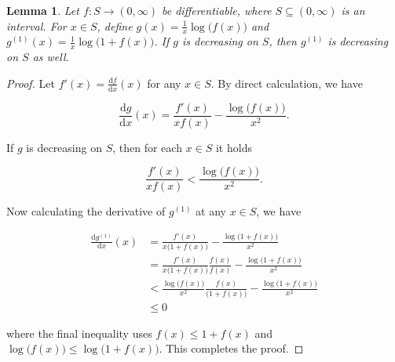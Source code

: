 \documentclass{article}
\newcommand{\D}{\textrm{d}}
\newtheorem{lemma}{Lemma}
\theoremstyle{remark}
\begin{document}
\begin{lemma}\label{lemma:log-plus-one}
    Let $f : S \rightarrow (0,\infty)$ be differentiable, where $S \subseteq (0,\infty)$ is an interval. For $x \in S$, define $g(x) = \frac1x\log\big(f(x)\big)$ and $g^{(1)}(x) = \frac1x \log\big(1 + f(x)\big)$. If $g$ is decreasing on $S$, then $g^{(1)}$ is decreasing on $S$ as well.
\end{lemma}

\begin{proof}
    Let $f'(x) = \frac{\D f}{\D x}(x)$ for any $x \in S$. By direct calculation, we have 

    \[\frac{\D g}{ \D x}(x) = \frac{f'(x)}{x f(x)} - \frac{\log \big(f(x)\big)}{x^2}.\]

    If $g$ is decreasing on $S$, then for each $x \in S$ it holds

    \[\frac{f'(x)}{x f(x)} < \frac{\log \big(f(x)\big)}{x^2}.\]

    Now calculating the derivative of $g^{(1)}$ at any $x \in S$, we have 

    \begin{align*}
        \frac{\D g^{(1)}}{\D x}(x) &= \frac{f'(x)}{x \big(1 + f(x)\big)} - \frac{\log \big(1 + f(x)\big)}{x^2} \\
        &= \frac{f'(x)}{x \big(1 + f(x)\big)}\frac{f(x)}{f(x)} - \frac{\log \big(1 + f(x)\big)}{x^2} \\
        &< \frac{\log \big(f(x)\big)}{x^2}\frac{f(x)}{\big(1 + f(x)\big)}- \frac{\log \big(1 + f(x)\big)}{x^2} \\
        &\leq 0
    \end{align*}

    where the final inequality uses $f(x) \leq 1 + f(x)$ and $\log\big(f(x)\big) \leq \log\big(1 + f(x)\big)$. This completes the proof.
\end{proof}
\end{document}
